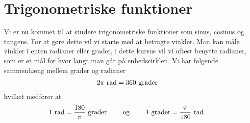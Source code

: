 \section{Trigonometriske funktioner}
\noindent Vi er nu kommet til at studere trigonometriske funktioner som sinus, cosinus og tangens. For at gøre dette vil vi starte med at betragte vinkler. Man kan måle vinkler i enten radianer eller grader, i dette kursus vil vi oftest benytte radianer, som er et mål for hvor langt man går på enhedscirklen. Vi har følgende sammenhæng mellem grader og radianer
\begin{align*}
2\pi \textup{ rad} = 360 \textup{ grader}
\end{align*}
hvilket medfører at 
\begin{align*}
1 \textup{ rad} = \frac{180}{\pi} \textup{ grader} \qquad \textup{ og } \qquad 1 \textup{ grader} = \frac{\pi}{180} \textup{ rad}.
\end{align*}
